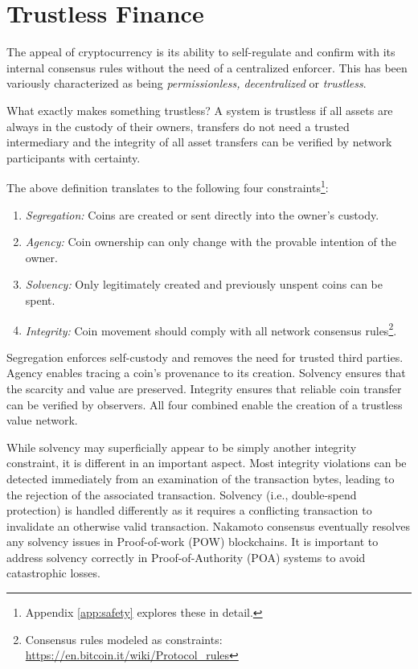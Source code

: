 \documentclass[12pt,a4paper]{article}
\begin{document}
\section{Trustless Finance}

The appeal of cryptocurrency is its ability to self-regulate and confirm with its internal consensus rules without the need of a centralized enforcer. This has been variously characterized as being \emph{permissionless, decentralized} or \emph{trustless}. 

What exactly makes something trustless? A system is trustless if all assets are always in the custody of their owners, transfers do not need a trusted intermediary and the integrity of all asset transfers can be verified by network participants with certainty.

The above definition translates to the following four constraints\footnote{Appendix \ref{app:safety} explores these in detail.}:
\begin{enumerate}
    \item \emph{Segregation:} Coins are created or sent directly into the owner’s custody. 
    \item \emph{Agency:} Coin ownership can only change with the provable intention of the owner.
    \item \emph{Solvency:} Only legitimately created and previously unspent coins can be spent.
    \item \emph{Integrity:} Coin movement should comply with all network consensus rules\footnote{Consensus rules modeled as constraints:                             \url{https://en.bitcoin.it/wiki/Protocol_rules}}.
\end{enumerate}
Segregation enforces self-custody and removes the need for trusted third parties. Agency enables tracing a coin’s provenance to its creation. Solvency ensures that the scarcity and value are preserved. Integrity ensures that reliable coin transfer can be verified by observers. All four combined enable the creation of a trustless value network. 

While solvency may superficially appear to be simply another integrity constraint, it is different in an important aspect. Most integrity violations can be detected immediately from an examination of the transaction bytes, leading to the rejection of the associated transaction. Solvency (i.e., double-spend protection) is handled differently as it requires a conflicting transaction to invalidate an otherwise valid transaction. Nakamoto consensus\cite{nakcons} eventually resolves any solvency issues in Proof-of-work (POW) blockchains\cite{DN93}. It is important to address solvency correctly in Proof-of-Authority (POA)\cite{parPOA} systems to avoid catastrophic losses.
\end{document}
